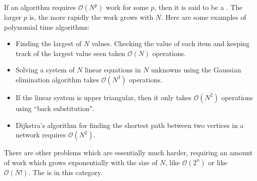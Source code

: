 \documentclass[aspectratio=169]{beamer}
\begin{document}
\begin{frame}[plain]{}

 
 If an algorithm requires $\mathcal{O}(N^p)$ work for some $p$,
 then it is said to be a .
 The larger $p$ is, the more rapidly the work grows with $N$. 
 Here are some examples of polynomial time
algorithms:
\begin{itemize}
 \item Finding the largest of $N$ values. Checking the value of each item and 
 keeping track of the largest value seen taken $\mathcal{O}(N)$ operations.
 \item Solving a system of $N$ linear equations in $N$ unknowns using 
  the Gaussian elimination algorithm takes $\mathcal{O}(N^3)$ operations.
  \item If the linear system is upper triangular, then it only takes $\mathcal{O}(N^2)$
   operations using ``back substitution".
  \item Dijkstra’s algorithm for finding the shortest path between two vertices in a network
 requires $\mathcal{O}(N^2)$. 
\end{itemize}

There are other problems which are essentially much harder, requiring
an amount of work which grows exponentially with the size of $N$, like $\mathcal{O}(2^n)$
or like $\mathcal{O}(N!)$. The  is in this category. 

\end{frame}
\end{document}

